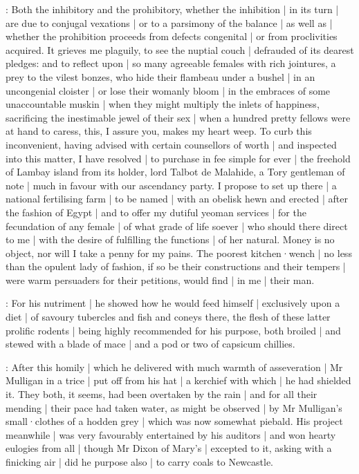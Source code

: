 \mulligan:
Both the inhibitory and the prohibitory,
whether the inhibition |
in its turn |
are due to conjugal vexations |
or to a parsimony of the balance |
as well as |
whether the prohibition proceeds from defects congenital |
or from proclivities acquired.
It grieves me plaguily,
to see the nuptial couch |
defrauded of its dearest pledges:
and to reflect upon |
so many agreeable females with rich jointures,
a prey to the vilest bonzes,
who hide their flambeau under a bushel |
in an uncongenial cloister |
or lose their womanly bloom |
in the embraces of some unaccountable muskin |
when they might multiply the inlets of happiness,
sacrificing the inestimable jewel of their sex |
when a hundred pretty fellows were at hand to caress,
this,
I assure you,
makes my heart weep.
To curb this inconvenient,
having advised with certain counsellors of worth |
and inspected into this matter,
I have resolved |
to purchase in fee simple for ever |
the freehold of Lambay island from its holder,
lord Talbot de Malahide,
a Tory gentleman of note |
much in favour with our ascendancy party.
I propose to set up there |
a national fertilising farm |
to be named  |
with an obelisk hewn and erected |
after the fashion of Egypt |
and to offer my dutiful yeoman services |
for the fecundation of any female |
of what grade of life soever |
who should there direct to me |
with the desire of fulfilling the functions |
of her natural.
Money is no object,
nor will I take a penny for my pains.
The poorest kitchen·wench |
no less than the opulent lady of fashion,
if so be their constructions and their tempers |
were warm persuaders for their petitions,
would find |
in me |
their man.

:
For his nutriment |
he showed how he would feed himself |
exclusively upon a diet |
of savoury tubercles and fish and coneys there,
the flesh of these latter prolific rodents |
being highly recommended for his purpose,
both broiled |
and stewed with a blade of mace |
and a pod or two of capsicum chillies.

:
After this homily |
which he delivered with much warmth of asseveration |
Mr Mulligan in a trice |
put off from his hat |
a kerchief with which |
he had shielded it.
They both,
it seems,
had been overtaken by the rain |
and for all their mending |
their pace had taken water,
as might be observed |
by Mr Mulligan's small·clothes of a hodden grey |
which was now somewhat piebald.
His project meanwhile |
was very favourably entertained by his auditors |
and won hearty eulogies from all |
though Mr Dixon of Mary's |
excepted to it,
asking with a finicking air |
did he purpose also |
to carry coals to Newcastle.

